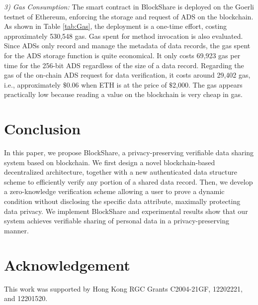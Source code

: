 \documentclass[11pt,divpdfm]{article}
\begin{document}
\emph{3) Gas Consumption:}
The smart contract in BlockShare is deployed on the Goerli testnet of Ethereum, enforcing the storage and request of ADS on the blockchain.
As shown in Table \ref{tab:Gas}, the deployment is a one-time effort, costing approximately 530,548 gas.
Gas spent for method invocation is also evaluated.
Since ADSs only record and manage the metadata of data records, the gas spent for the ADS storage function is quite economical.
It only costs 69,923 gas per time for the 256-bit ADS regardless of the size of a data record.
Regarding the gas of the on-chain ADS request for data verification, it costs around 29,402 gas, i.e., approximately $\$$0.06 when ETH is at the price of $\$$2,000.
The gas appears practically low because reading a value on the blockchain is very cheap in gas.



\begin{table}[h]
	\caption{Gas consumption of smart contract}
	\label{tab:Gas}
	\centering
\end{table}






\section{Conclusion}
In this paper, we propose BlockShare, a privacy-preserving verifiable data sharing system based on blockchain.
We first design a novel blockchain-based decentralized architecture, together with a new authenticated data structure scheme to efficiently verify any portion of a shared data record.
Then, we develop a zero-knowledge verification scheme allowing a user to prove a dynamic condition without disclosing the specific data attribute, maximally protecting data privacy.
We implement BlockShare and experimental results show that our system achieves verifiable sharing of personal data in a privacy-preserving manner.


\section*{Acknowledgement}
This work was supported by Hong Kong RGC Grants C2004-21GF, 12202221, and 12201520.
\end{document}
